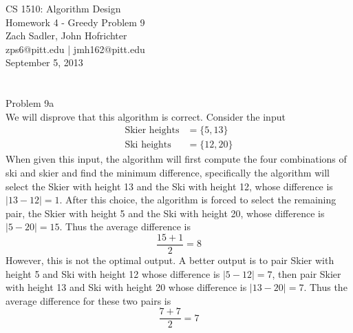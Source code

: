 \documentclass[11pt]{article}
\begin{document}
\noindent 
CS 1510: Algorithm Design\\
Homework 4 - Greedy Problem 9\\
Zach Sadler, John Hofrichter\\
zps6@pitt.edu | jmh162@pitt.edu\\
September 5, 2013\\ 
\\ 
\\

\noindent \huge 
Problem 9a\\
\normalsize
\noindent 
We will disprove that this algorithm is correct. Consider the input
\begin{align*}
	\text{Skier heights} & = \{5, 13\}\\
        \text{Ski heights} &= \{12, 20\}
\end{align*}
When given this input, the algorithm will first compute the four combinations of ski and skier and find the minimum difference, specifically the algorithm will select the Skier with height 13 and the Ski with height 12, whose difference is $|13 - 12| = 1$. After this choice, the algorithm is forced to select the remaining pair, the Skier with height 5 and the Ski with height 20, whose difference is $|5 - 20| = 15$. Thus the average difference is 
\[
	\frac{15 + 1}{2} = 8
\]
However, this is not the optimal output. A better output is to pair Skier with height 5 and Ski with height 12 whose difference is $|5 - 12| = 7$, then pair Skier with height 13 and Ski with height 20 whose difference is $|13 - 20| = 7$. Thus the average difference for these two pairs is
\[
	\frac{7 + 7}{2} = 7
\]
\end{document}
